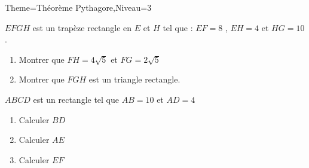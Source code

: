 \documentclass[a4paper,12pt]{article}
\begin{document}
\begin{Maquette}[Fiche]{Theme=Théorème Pythagore,Niveau=3}
\begin{exercice}
\begin{minipage}{.6\linewidth}
$EFGH$ est un trapèze rectangle en $E$ et $H$ tel que : $EF=8$ , $EH=4$ et $HG=10$.
\begin{enumerate}
\item Montrer que $FH=4\sqrt{5}$ et $FG=2\sqrt{5}$
\item Montrer que $FGH$ est un triangle rectangle. 
\end{enumerate}
\end{minipage}%
\begin{minipage}{.4\linewidth}
\end{minipage}
\end{exercice}

\begin{exercice}
\begin{minipage}{.6\linewidth}
$ABCD$ est un rectangle tel que $AB=10$ et $AD=4$
\begin{enumerate}
\item Calculer $BD$
\item Calculer $AE$
\item Calculer $EF$
\end{enumerate}
\end{minipage}%
\begin{minipage}{.4\linewidth}
\end{minipage}
\end{exercice}


\end{Maquette}
\end{document}
